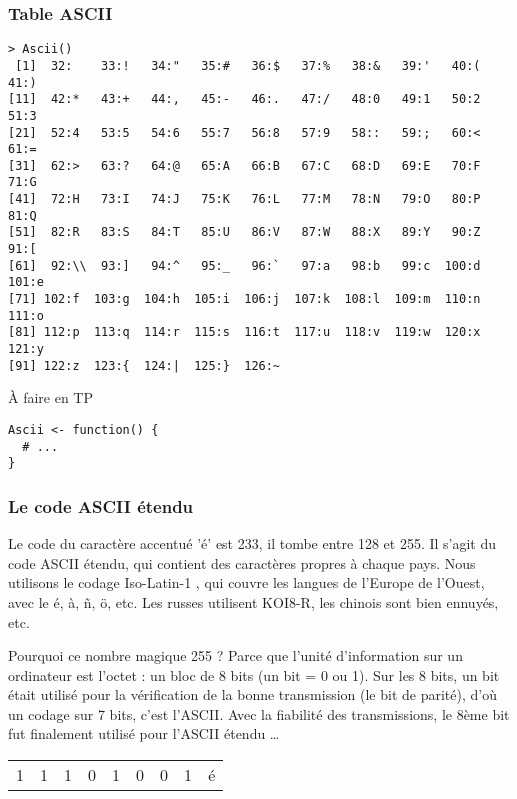 \documentclass[10pt]{beamer}
\begin{document}
\begin{frame}
  \frametitle{Table ASCII}
  {
    \footnotesize
\begin{verbatim}
> Ascii()
 [1]  32:    33:!   34:"   35:#   36:$   37:%   38:&   39:'   40:(   41:)
[11]  42:*   43:+   44:,   45:-   46:.   47:/   48:0   49:1   50:2   51:3
[21]  52:4   53:5   54:6   55:7   56:8   57:9   58::   59:;   60:<   61:=
[31]  62:>   63:?   64:@   65:A   66:B   67:C   68:D   69:E   70:F   71:G
[41]  72:H   73:I   74:J   75:K   76:L   77:M   78:N   79:O   80:P   81:Q
[51]  82:R   83:S   84:T   85:U   86:V   87:W   88:X   89:Y   90:Z   91:[
[61]  92:\\  93:]   94:^   95:_   96:`   97:a   98:b   99:c  100:d  101:e
[71] 102:f  103:g  104:h  105:i  106:j  107:k  108:l  109:m  110:n  111:o
[81] 112:p  113:q  114:r  115:s  116:t  117:u  118:v  119:w  120:x  121:y
[91] 122:z  123:{  124:|  125:}  126:~
\end{verbatim}
  }

  \begin{block}{À faire en TP}
    \begin{lstlisting}[style=edblock]
Ascii <- function() {
  # ...
}
\end{lstlisting}
  \end{block}
\end{frame}


\begin{frame}[fragile]
  \frametitle{Le code ASCII étendu}
  Le code du caractère accentué 'é' est 233, il tombe entre 128 et 255.
  Il s'agit du code ASCII étendu, qui contient des caractères propres à chaque pays.
  Nous utilisons le codage Iso-Latin-1 , qui couvre les langues de l'Europe de l'Ouest, avec le \'e, \`a, \~n, \"o, etc.
  Les russes utilisent KOI8-R, les chinois sont bien ennuyés, etc.

  \begin{block}{Pourquoi ce nombre magique 255 ?}
  Parce que l'unité d'information sur un ordinateur est l'octet : un bloc de 8 bits (un bit = 0 ou 1).
Sur les 8 bits, un bit était utilisé pour la vérification de la bonne transmission (le bit de parité), d'où un
codage sur 7 bits, c'est l'ASCII.
Avec la fiabilité des transmissions, le 8ème bit fut finalement utilisé pour l'ASCII étendu \dots

\begin{tabular}{|*{8}{c|}r}
  \cline{1-8}
  1 & 1 & 1& 0 & 1 & 0 & 0 & 1 & é\\
  \cline{1-8}
\end{tabular}
\end{block}
\end{frame}
\end{document}
